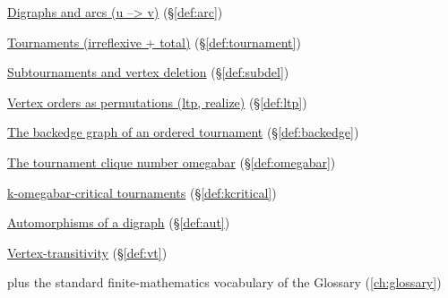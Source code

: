 \begin{closurepanel}
\item \hyperref[def:arc]{Digraphs and arcs (u --> v)} (\S\ref*{def:arc})
\item \hyperref[def:tournament]{Tournaments (irreflexive + total)} (\S\ref*{def:tournament})
\item \hyperref[def:subdel]{Subtournaments and vertex deletion} (\S\ref*{def:subdel})
\item \hyperref[def:ltp]{Vertex orders as permutations (ltp, realize)} (\S\ref*{def:ltp})
\item \hyperref[def:backedge]{The backedge graph of an ordered tournament} (\S\ref*{def:backedge})
\item \hyperref[def:omegabar]{The tournament clique number omegabar} (\S\ref*{def:omegabar})
\item \hyperref[def:kcritical]{k-omegabar-critical tournaments} (\S\ref*{def:kcritical})
\item \hyperref[def:aut]{Automorphisms of a digraph} (\S\ref*{def:aut})
\item \hyperref[def:vt]{Vertex-transitivity} (\S\ref*{def:vt})
\item plus the standard finite-mathematics vocabulary of the Glossary (\cref{ch:glossary})
\end{closurepanel}
